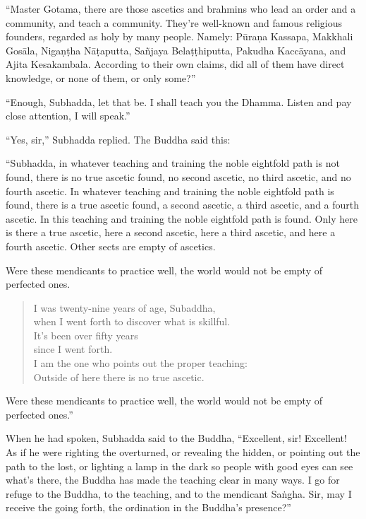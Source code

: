 \documentclass[12pt,openany]{book}%
\begin{document}
“Master Gotama, there are those ascetics and brahmins who lead an order and a community, and teach a community. They’re well-known and famous religious founders, regarded as holy by many people. Namely: \textsanskrit{Pūraṇa} Kassapa, Makkhali \textsanskrit{Gosāla}, \textsanskrit{Nigaṇṭha} \textsanskrit{Nāṭaputta}, \textsanskrit{Sañjaya} \textsanskrit{Belaṭṭhiputta}, Pakudha \textsanskrit{Kaccāyana}, and Ajita Kesakambala. According to their own claims, did all of them have direct knowledge, or none of them, or only some?” 

“Enough, Subhadda, let that be. I shall teach you the Dhamma. Listen and pay close attention, I will speak.” 

“Yes, sir,” Subhadda replied. The Buddha said this: 

“Subhadda, in whatever teaching and training the noble eightfold path is not found, there is no true ascetic found, no second ascetic, no third ascetic, and no fourth ascetic. In whatever teaching and training the noble eightfold path is found, there is a true ascetic found, a second ascetic, a third ascetic, and a fourth ascetic. In this teaching and training the noble eightfold path is found. Only here is there a true ascetic, here a second ascetic, here a third ascetic, and here a fourth ascetic. Other sects are empty of ascetics. 

Were these mendicants to practice well, the world would not be empty of perfected ones. 

\begin{verse}%
I was twenty-nine years of age, Subaddha, \\
when I went forth to discover what is skillful. \\
It’s been over fifty years \\
since I went forth. \\
I am the one who points out the proper teaching: \\
Outside of here there is no true ascetic. 

%
\end{verse}

Were these mendicants to practice well, the world would not be empty of perfected ones.” 

When he had spoken, Subhadda said to the Buddha, “Excellent, sir! Excellent! As if he were righting the overturned, or revealing the hidden, or pointing out the path to the lost, or lighting a lamp in the dark so people with good eyes can see what’s there, the Buddha has made the teaching clear in many ways. I go for refuge to the Buddha, to the teaching, and to the mendicant \textsanskrit{Saṅgha}. Sir, may I receive the going forth, the ordination in the Buddha’s presence?” 
\end{document}

